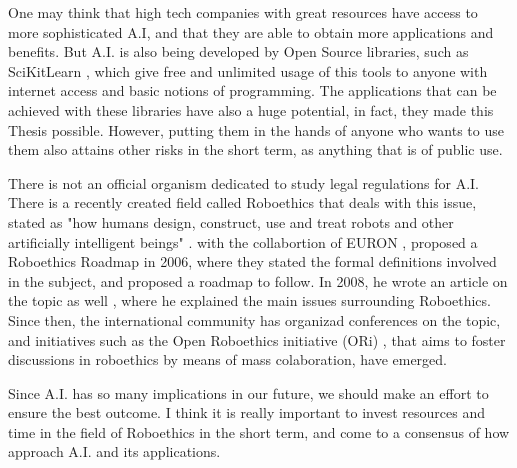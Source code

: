 One may think that high tech companies with great resources have access to more sophisticated A.I, and that they are able to obtain more applications and benefits. But A.I. is also being developed by Open Source libraries, such as SciKitLearn \cite{scikit-learn}, which give free and unlimited usage of this tools to anyone with internet access and basic notions of programming. The applications that can be achieved with these libraries have also a huge potential, in fact, they made this Thesis possible. However, putting them in the hands of anyone who wants to use them also attains other risks in the short term, as anything that is of public use.

There is not an official organism dedicated to study legal regulations for A.I. There is a recently created field called Roboethics that deals with this issue, stated as "how humans design, construct, use and treat robots and other artificially intelligent beings" \cite{wiki-roboethics}. \citeauthor{roboethics} with the collabortion of EURON \cite{EURON}, proposed a Roboethics Roadmap \cite{roadmap} in 2006, where they stated the formal definitions involved in the subject, and proposed a roadmap to follow. In 2008, he wrote an article on the topic as well \cite{roboethics}, where he explained the main issues surrounding Roboethics. Since then, the international community has organizad conferences on the topic, and initiatives such as the Open Roboethics initiative (ORi) \cite{ori}, that aims to foster discussions in roboethics by means of mass colaboration, have emerged.

Since A.I. has so many implications in our future, we should make an effort to ensure the best outcome. I think it is really important to invest resources and time in the field of Roboethics in the short term, and come to a consensus of how approach A.I. and its applications.   
 

\begin{flushright}

\end{flushright}
